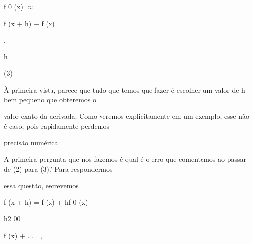 \documentclass[a4paper,portrait,12pt]{article}
\begin{document}
\begin{flushleft}
f 0 (x) $\approx$
\end{flushleft}





\begin{flushleft}
f (x + h) $-$ f (x)
\end{flushleft}


.


\begin{flushleft}
h
\end{flushleft}





(3)





\begin{flushleft}
\`{A} primeira vista, parece que tudo que temos que fazer \'{e} escolher um valor de h bem pequeno que obteremos o
\end{flushleft}


\begin{flushleft}
valor exato da derivada. Como veremos explicitamente em um exemplo, esse n\~{a}o \'{e} caso, pois rapidamente perdemos
\end{flushleft}


\begin{flushleft}
precis\~{a}o num\'{e}rica.
\end{flushleft}


\begin{flushleft}
A primeira pergunta que nos fazemos \'{e} qual \'{e} o erro que comentemos ao passar de (2) para (3)? Para respondermos
\end{flushleft}


\begin{flushleft}
essa quest\~{a}o, escrevemos
\end{flushleft}


\begin{flushleft}
f (x + h) = f (x) + hf 0 (x) +
\end{flushleft}





\begin{flushleft}
h2 00
\end{flushleft}


\begin{flushleft}
f (x) + . . . ,
\end{flushleft}
\end{document}

